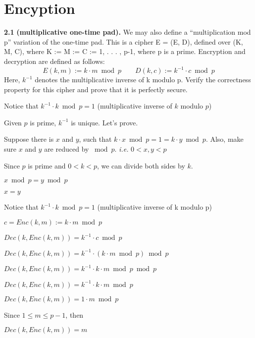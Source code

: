 \chapter{Encyption}

\noindent
\textbf{2.1}
\textbf{(multiplicative one-time pad).} We may also define a “multiplication mod p” variation of the one-time pad.
This is a cipher E = (E, D), defined over (K, M, C), where K := M := C := {1, . . . , p-1}, where p is a prime.
Encryption and decryption are defined as follows:
\[
E(k, m) := k \cdot m \bmod p \quad\quad
D(k, c) := k^{-1} \cdot c \bmod p
\]
Here, $k^{-1}$ denotes the multiplicative inverse of k modulo p. Verify the correctness property for this
cipher and prove that it is perfectly secure.


\begin{tcolorbox}[solutionbox, title=Answer: Auxiliary]
    Notice that $k^{-1} \cdot k \bmod p = 1$ (multiplicative inverse of $k$ modulo $p$)
    \vspace{1em}

    Given $p$ is prime, $k^{-1}$ is unique. Let's prove.

    Suppose there is $x$ and $y$, such that $k \cdot x \bmod p = 1 = k \cdot y \bmod p$. Also, make sure $x$ and $y$ are reduced by $\bmod p$. \textit{i.e.} $0 < x, y < p$

    Since $p$ is prime and $0 < k < p$, we can divide both sides by $k$.

    $x \bmod p = y \bmod p$

    $x = y$

\end{tcolorbox}


\begin{tcolorbox}[solutionbox, title=Answer: Correctess]
    Notice that $k^{-1} \cdot k \bmod p = 1$ (multiplicative inverse of k modulo p)
    \vspace{1em}

    $c = Enc(k, m):= k \cdot m \bmod p$

    $Dec(k, Enc(k, m)) = k^{-1} \cdot c \bmod p$

    $Dec(k, Enc(k, m)) = k^{-1} \cdot (k \cdot m \bmod p) \bmod p$

    $Dec(k, Enc(k, m)) = k^{-1} \cdot k \cdot m \bmod p \bmod p$

    $Dec(k, Enc(k, m)) = k^{-1} \cdot k \cdot m \bmod p$

    $Dec(k, Enc(k, m)) = 1 \cdot m \bmod p$

    Since $1 \leqslant  m \leqslant p-1$, then

    $Dec(k, Enc(k, m)) = m$
\end{tcolorbox}

